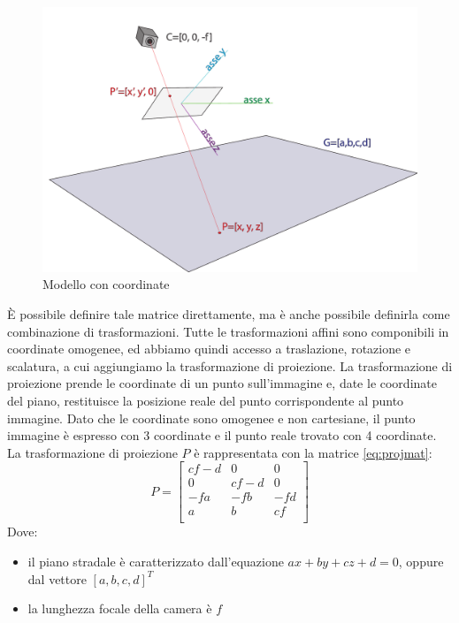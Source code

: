 \begin{figure}
    \caption{Modello con coordinate}
    \label{fig:camera coords}
    \centering
    \includegraphics[width=\textwidth]{images/camera coords.pdf}
\end{figure}

È possibile definire tale matrice direttamente, ma è anche possibile definirla come combinazione di trasformazioni.
Tutte le trasformazioni affini sono componibili in coordinate omogenee, ed abbiamo quindi accesso a traslazione, rotazione e scalatura, a cui aggiungiamo la trasformazione di proiezione.
La trasformazione di proiezione prende le coordinate di un punto sull'immagine e, date le coordinate del piano, restituisce la posizione reale del punto corrispondente al punto immagine.
Dato che le coordinate sono omogenee e non cartesiane, il punto immagine è espresso con 3 coordinate e il punto reale trovato con 4 coordinate.
La trasformazione di proiezione $P$ è rappresentata con la matrice \ref{eq:projmat}:
\begin{equation}
        \label{eq:projmat}
        P = 
        \begin{bmatrix}
            cf - d & 0      & 0   \\
            0      & cf - d & 0   \\
            -fa    & -fb    & -fd \\
            a      & b      & cf  \\
        \end{bmatrix}
\end{equation}
Dove:
\begin{itemize}
    \item il piano stradale è caratterizzato dall'equazione $ax + by + cz + d = 0$, oppure dal vettore $[a, b, c, d]^T$
    \item la lunghezza focale della camera è $f$
\end{itemize}

